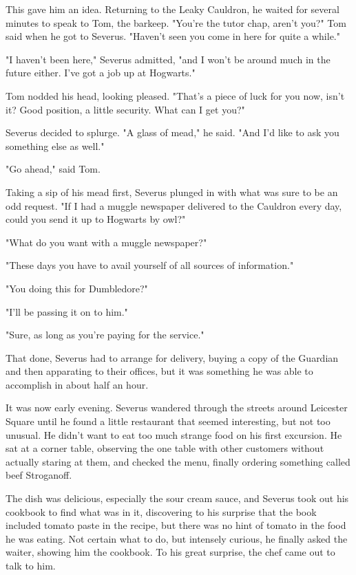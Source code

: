 This gave him an idea. Returning to the Leaky Cauldron, he waited for several minutes to speak to Tom, the barkeep. "You're the tutor chap, aren't you?" Tom said when he got to Severus. "Haven't seen you come in here for quite a while."

"I haven't been here," Severus admitted, "and I won't be around much in the future either. I've got a job up at Hogwarts."

Tom nodded his head, looking pleased. "That's a piece of luck for you now, isn't it? Good position, a little security. What can I get you?"

Severus decided to splurge. "A glass of mead," he said. "And I'd like to ask you something else as well."

"Go ahead," said Tom.

Taking a sip of his mead first, Severus plunged in with what was sure to be an odd request. "If I had a muggle newspaper delivered to the Cauldron every day, could you send it up to Hogwarts by owl?"

"What do you want with a muggle newspaper?"

"These days you have to avail yourself of all sources of information."

"You doing this for Dumbledore?"

"I'll be passing it on to him."

"Sure, as long as you're paying for the service."

That done, Severus had to arrange for delivery, buying a copy of the Guardian and then apparating to their offices, but it was something he was able to accomplish in about half an hour.

It was now early evening. Severus wandered through the streets around Leicester Square until he found a little restaurant that seemed interesting, but not too unusual. He didn't want to eat too much strange food on his first excursion. He sat at a corner table, observing the one table with other customers without actually staring at them, and checked the menu, finally ordering something called beef Stroganoff.

The dish was delicious, especially the sour cream sauce, and Severus took out his cookbook to find what was in it, discovering to his surprise that the book included tomato paste in the recipe, but there was no hint of tomato in the food he was eating. Not certain what to do, but intensely curious, he finally asked the waiter, showing him the cookbook. To his great surprise, the chef came out to talk to him.

